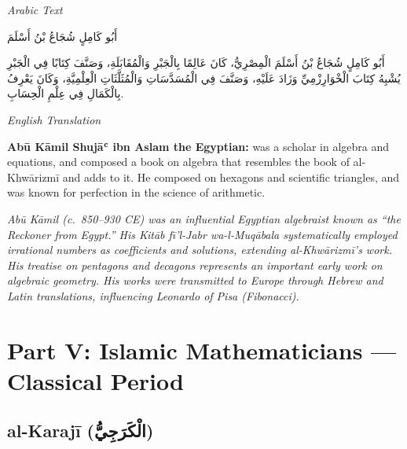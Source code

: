 \documentclass[11pt,a4paper]{article}
\def\RL#1{\beginR#1\endR}
\newcommand{\cnote}[1]{\textcolor{notecolor}{\textit{#1}}}
\newcommand{\textarabic}[1]{{\arabicfont\RL{#1}}}
\newenvironment{arabiccol}{%
  \begin{minipage}[t]{0.48\textwidth}%
  \begin{tcolorbox}[colback=leftbg,colframe=rulecolor,boxrule=0.4pt,arc=2pt,left=5pt,right=5pt,top=5pt,bottom=5pt]%
  \centering\textit{\footnotesize Arabic Text}\\[0.4em]%
  \raggedright\arabicfont\small%
}{%
  \end{tcolorbox}%
  \end{minipage}%
}
\newenvironment{englishcol}{%
  \begin{minipage}[t]{0.48\textwidth}%
  \begin{tcolorbox}[colback=rightbg,colframe=rulecolor,boxrule=0.4pt,arc=2pt,left=5pt,right=5pt,top=5pt,bottom=5pt]%
  \centering\textit{\footnotesize English Translation}\\[0.4em]%
  \raggedright\small%
}{%
  \end{tcolorbox}%
  \end{minipage}%
}
\begin{document}
\noindent
\begin{arabiccol}
\beginR
أَبُو كَامِلٍ شُجَاعُ بْنُ أَسْلَمَ

أَبُو كَامِلٍ شُجَاعُ بْنُ أَسْلَمَ الْمِصْرِيُّ، كَانَ عَالِمًا بِالْجَبْرِ وَالْمُقَابَلَةِ، وَصَنَّفَ كِتَابًا فِي الْجَبْرِ يُشْبِهُ كِتَابَ الْخْوَارِزْمِيِّ وَزَادَ عَلَيْهِ، وَصَنَّفَ فِي الْمُسَدَّسَاتِ وَالْمُثَلَّثَاتِ الْعِلْمِيَّةِ، وَكَانَ يَعْرِفُ بِالْكَمَالِ فِي عِلْمِ الْحِسَابِ.
\endR
\end{arabiccol}
\hfill
\begin{englishcol}
\textbf{Abū Kāmil Shujāʿ ibn Aslam the Egyptian:} was a scholar in algebra and equations, and composed a book on algebra that resembles the book of al-Khwārizmī and adds to it. He composed on hexagons and scientific triangles, and was known for perfection in the science of arithmetic.

\cnote{Abū Kāmil (c.~850--930 CE) was an influential Egyptian algebraist known as ``the Reckoner from Egypt.'' His \textit{Kitāb fī'l-Jabr wa-l-Muqābala} systematically employed irrational numbers as coefficients and solutions, extending al-Khwārizmī's work. His treatise on pentagons and decagons represents an important early work on algebraic geometry. His works were transmitted to Europe through Hebrew and Latin translations, influencing Leonardo of Pisa (Fibonacci).}
\end{englishcol}

\par\vspace{0.5em}

\newpage

\section{Part V: Islamic Mathematicians --- Classical Period}
\label{sec:islamic-classical}

\subsection{al-Karajī (\textarabic{الْكَرَجِيُّ})}
\end{document}
